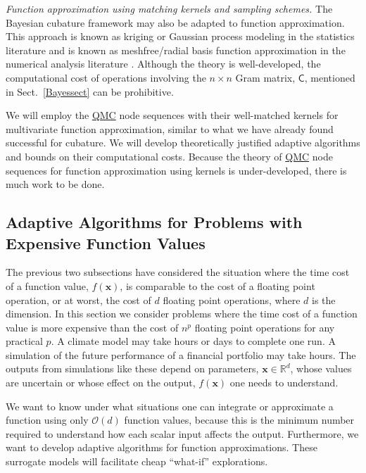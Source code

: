 \documentclass[11pt]{NSFamsart}
\newcommand{\QMC}{\hyperlink{QMClink}{QMC}\xspace}
\newcommand{\reals}{{\mathbb{R}}}
\newcommand{\mC}{\mathsf{C}}
\newcommand{\bx}{{\boldsymbol{x}}}
\newcommand{\Order}{\mathcal{O}}
\begin{document}
\emph{Function approximation using matching kernels and sampling schemes.}
The Bayesian cubature framework may also be adapted to function approximation.  This approach is 
known as kriging or Gaussian process modeling in the statistics literature \cite{RasWil06a,Ste99} 
and is known as meshfree/radial basis function 
approximation in the 
numerical analysis literature \cite{Fas07a,FasMcC15a,Wen05a}.  Although the theory is 
well-developed, the computational cost of operations involving the $n \times n$ Gram matrix, 
$\mC$, mentioned in Sect.\ \ref{Bayessect} can be prohibitive.  

We will employ the \QMC node sequences with their well-matched kernels for multivariate function 
approximation, similar to what  we 
have already found successful for cubature.  We will 
develop theoretically justified adaptive algorithms and bounds on their computational costs.  
Because the theory of \QMC node sequences for function approximation using kernels is 
under-developed, there 
is much work to be done.

\subsection{Adaptive Algorithms for Problems with Expensive Function Values} 
\label{SectExpensive}
The previous two subsections have considered the situation where the time cost of a function value, 
$f(\bx)$, is comparable to the cost of a floating point operation, or at worst, the cost of $d$ floating 
point 
operations, where $d$ is the dimension.  In this section we consider problems where the time cost 
of a function value is more expensive than the cost of $n^p$ floating point operations for any 
practical $p$.  A climate model may take hours or days to complete one run.  A simulation of the 
future performance of a financial portfolio may take hours.  The outputs from simulations like these 
depend on parameters, $\bx \in \reals^d$, whose values are uncertain or whose effect 
on the output, $f(\bx)$ one needs to understand.

We want to know under what situations one can integrate or approximate a function using only
$\Order(d)$ function values, because this is the minimum number required to understand how each 
scalar input affects the output.  Furthermore, we want to develop adaptive algorithms for function 
approximations.  These surrogate models will facilitate cheap ``what-if'' explorations. 
\end{document}

